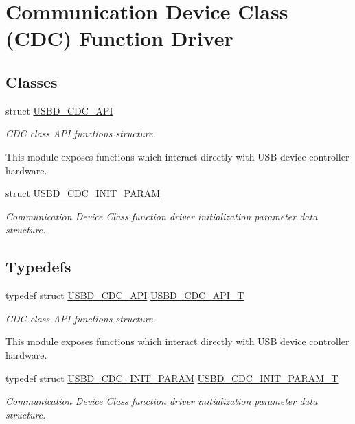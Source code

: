 \hypertarget{group__USBD__CDC}{}\section{Communication Device Class (C\+DC) Function Driver}
\label{group__USBD__CDC}
\subsection*{Classes}
\begin{DoxyCompactItemize}
\item 
struct \hyperlink{structUSBD__CDC__API}{U\+S\+B\+D\+\_\+\+C\+D\+C\+\_\+\+A\+PI}
\begin{DoxyCompactList}\small\item\em C\+DC class A\+PI functions structure.

This module exposes functions which interact directly with U\+SB device controller hardware. \end{DoxyCompactList}\item 
struct \hyperlink{structUSBD__CDC__INIT__PARAM}{U\+S\+B\+D\+\_\+\+C\+D\+C\+\_\+\+I\+N\+I\+T\+\_\+\+P\+A\+R\+AM}
\begin{DoxyCompactList}\small\item\em Communication Device Class function driver initialization parameter data structure. \end{DoxyCompactList}\end{DoxyCompactItemize}
\subsection*{Typedefs}
\begin{DoxyCompactItemize}
\item 
typedef struct \hyperlink{structUSBD__CDC__API}{U\+S\+B\+D\+\_\+\+C\+D\+C\+\_\+\+A\+PI} \hyperlink{group__USBD__CDC_gaad7f61aed01ad4130bee0f50b17eb716}{U\+S\+B\+D\+\_\+\+C\+D\+C\+\_\+\+A\+P\+I\+\_\+T}
\begin{DoxyCompactList}\small\item\em C\+DC class A\+PI functions structure.

This module exposes functions which interact directly with U\+SB device controller hardware. \end{DoxyCompactList}\item 
typedef struct \hyperlink{structUSBD__CDC__INIT__PARAM}{U\+S\+B\+D\+\_\+\+C\+D\+C\+\_\+\+I\+N\+I\+T\+\_\+\+P\+A\+R\+AM} \hyperlink{group__USBD__CDC_ga78b2c5f20653181161c59062795233b3}{U\+S\+B\+D\+\_\+\+C\+D\+C\+\_\+\+I\+N\+I\+T\+\_\+\+P\+A\+R\+A\+M\+\_\+T}
\begin{DoxyCompactList}\small\item\em Communication Device Class function driver initialization parameter data structure. \end{DoxyCompactList}\end{DoxyCompactItemize}


